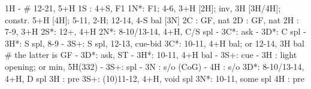1H -  # 12-21, 5+H
1S : 4+S, F1
1N*: F1; 4-6, 3+H [2H]; inv, 3H [3H/4H]; constr. 5+H [4H]; 5-11, 2-H; 12-14, 4-S bal [3N]
2C : GF, nat
2D : GF, nat
2H : 7-9, 3+H
2S*: 12+, 4+H
2N*: 8-10/13-14, 4+H, C/S spl
   - 3C*: ask
        - 3D*: C spl
        - 3H*: S spl, 8-9
        - 3S+: S spl, 12-13, cue-bid
3C*: 10-11, 4+H bal; or 12-14, 3H bal  # the latter is GF
   - 3D*: ask, ST
        - 3H*: 10-11, 4+H bal
        - 3S+: cue
   - 3H : light opening; or min, 5H(332)
   - 3S+: spl
   - 3N : s/o (CoG)
   - 4H : s/o
3D*: 8-10/13-14, 4+H, D spl
3H : pre
3S+: (10)11-12, 4+H, void spl
3N*: 10-11, some spl
4H : pre